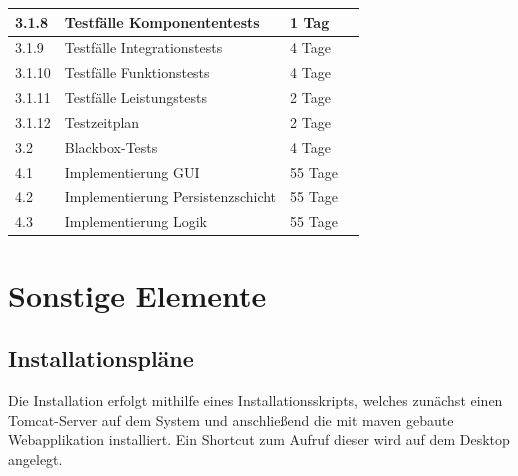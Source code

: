 \documentclass[fontsize=12pt,paper=a4,twoside]{scrartcl}
\begin{document}
\begin{tabularx}{\textwidth}{|p{1cm}|p{5.5cm}|p{2cm}|X|}
\hline 		3.1.8	& Testfälle Komponententests			&	1 Tag		&	\\
\hline 		3.1.9	& Testfälle Integrationstests			&	4 Tage		&	\\
\hline		3.1.10  & Testfälle Funktionstests				&	4 Tage		&	\\
\hline 		3.1.11	& Testfälle Leistungstests				&	2 Tage		&	\\
\hline 		3.1.12	& Testzeitplan							&	2 Tage		&	\\
\hline 		3.2		& Blackbox-Tests						&	4 Tage		&	\\
\hline 		4.1		& Implementierung GUI					&	55 Tage		&	\\
\hline 		4.2		& Implementierung Persistenzschicht		&	55 Tage		&	\\
\hline 		4.3		& Implementierung Logik					&	55 Tage		&	\\	
\hline
\end{tabularx}
\clearpage

\section{Sonstige Elemente}

\subsection{Installationspläne}
Die Installation erfolgt mithilfe eines Installationsskripts, welches zunächst einen Tomcat-Server auf dem System und anschließend die mit maven gebaute Webapplikation installiert. Ein Shortcut zum Aufruf dieser wird auf dem Desktop angelegt. 
\end{document}
